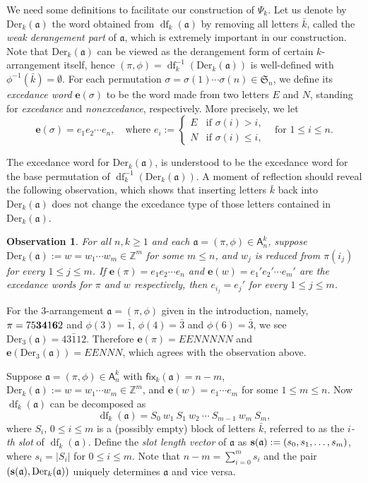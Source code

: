 \documentclass[12pt]{amsart}
\numberwithin{equation}{section}
\theoremstyle{plain}
\newtheorem{Observation}[theorem]{Observation}
\theoremstyle{definition}
\newcommand{\Z}{\mathbb{Z}}
\newcommand\A{\mathsf{A}}
\def\Der{\mathrm{Der}}
\def\fix{\mathsf{fix}}
\def\S{\mathfrak{S}}
\def\a{\mathfrak{a}}
\def\s{\operatorname{{\bf s}}}
\def\df{\operatorname{df}}
\def\s{\operatorname{{\bf s}}}
\def\ee{\mathbf{e}}
\def\neg#1{{{{\bar#1}}}}
\begin{document}
We need some definitions to facilitate our construction of $\Psi_k$. 
Let us denote by 
$\Der_k(\a)$
the word obtained from $\df_k(\a)$ by removing all letters $\neg k$, called the  {\em weak derangement part} of $\a$, which is extremely  important in our construction. Note that $\Der_k(\a)$ can be viewed as the derangement form of certain $k$-arrangement itself, hence $(\pi,\phi)=\df_k^{-1}(\Der_k(\a))$ is well-defined with $\phi^{-1}(\neg k)=\emptyset$. For each permutation $\sigma=\sigma(1)\cdots\sigma(n)\in\S_n$, we define its {\em excedance word} $\ee(\sigma)$ to be the word made from two letters $E$ and $N$, standing for {\em excedance} and {\em nonexcedance}, respectively. More precisely, we let
$$\ee(\sigma)=e_1e_2\cdots e_n, \quad \text{where } e_i:=\begin{cases}
E & \text{if $\sigma(i)>i$,}\\
N & \text{if $\sigma(i)\le i$,}
\end{cases}\quad \text{for }1\le i\le n.$$

The excedance word for $\Der_k(\a)$, is understood to be the excedance word for the base permutation of $\df_k^{-1}(\Der_k(\a))$. A moment of reflection should reveal the following observation, which shows that inserting letters $\neg k$ back into $\Der_k(\a)$ does not change the excedance type of those letters contained in $\Der_k(\a)$.
\begin{Observation}\label{exc word}
For all $n,k\ge 1$ and each $\a=(\pi,\phi)\in\A_n^k$, suppose $\Der_k(\a):=w=w_1\cdots w_m\in\Z^m$ for some $m\le n$, and $w_j$ is reduced from $\pi(i_j)$ for every $1\le j\le m$. If $\ee(\pi)=e_1e_2\cdots e_n$ and $\ee(w)=e_1'e_2'\cdots e_m'$ are the excedance words for $\pi$ and $w$ respectively, then $e_{i_j}=e_j'$ for every $1\le j\le m$.
\end{Observation}

For the $3$-arrangement $\a=(\pi,\phi)$ given in the introduction, namely, $\pi=75{\bf3}{\bf4}1{\bf6}2$ and $\phi(3)=\neg 1$, $\phi(4)=\neg 3$ and $\phi(6)=\neg 3$, we see $\Der_3(\a)=43\neg112$. Therefore $\ee(\pi)=EENNNNN$ and $\ee(\Der_3(\a))=EENNN$, which agrees with the observation above.

Suppose $\a=(\pi,\phi)\in\A_n^k$ with $\fix_k(\a)=n-m$, $\Der_k(\a):=w=w_1 \cdots w_{m}\in\Z^m$, and $\ee(w)=e_1\cdots e_m$ for some $1\le m\le n$. Now $\df_k(\a)$ can be decomposed as 
$$\df_k(\a)=S_0\:w_1\:S_1\:w_2\:\cdots\:S_{m-1}\:w_m\:S_m,$$
where $S_i$, $0\le i\le m$ is a (possibly empty) block of letters $\neg k$, referred to as the {\em $i$-th slot} of $\df_k(\a)$. Define the {\em slot length vector} of $\a$ as $\s(\a):=(s_0,s_1,\ldots,s_{m})$, where $s_i=|S_i|$ for $0\le i\le m$. Note that $n-m=\sum_{i=0}^{m}s_i$ and the pair $(\s(\a),\Der_k(\a))$ uniquely determines $\a$ and vice versa. 
\end{document}
